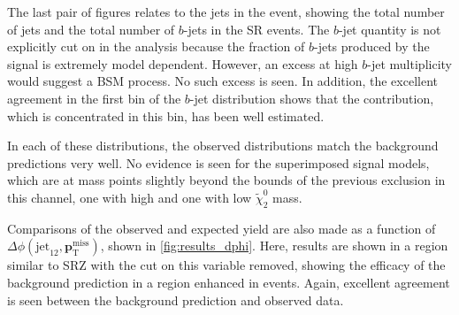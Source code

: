 The last pair of figures relates to the jets in the event, showing the total number of jets and the total number of $b$-jets in the \ac{SR} events. The $b$-jet quantity is not explicitly cut on in the analysis because the fraction of $b$-jets produced by the signal is extremely model dependent. However, an excess at high $b$-jet multiplicity would suggest a \ac{BSM} process. No such excess is seen. In addition, the excellent agreement in the first bin of the $b$-jet distribution shows that the \dyjets contribution, which is concentrated in this bin, has been well estimated.

In each of these distributions, the observed distributions match the background predictions very well. No evidence is seen for the superimposed signal models, which are at mass points slightly beyond the bounds of the previous exclusion in this channel, one with high and one with low $\tilde{\chi}^{0}_{2}$ mass.


Comparisons of the observed and expected yield are also made as a function of $\Delta\phi(\text{jet}_{12},{\boldsymbol p}_{\mathrm{T}}^\mathrm{miss})$, shown in \autoref{fig:results_dphi}. Here, results are shown in a region similar to SRZ with the cut on this variable removed, showing the efficacy of the background prediction in a region enhanced in \dyjets events. Again, excellent agreement is seen between the background prediction and observed data.

